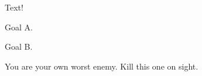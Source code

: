 \documentclass[char]{elementals}
\begin{document}
\name{\cDema{}}

Text!

\begin{itemz}[Goals]
  \item Goal A.
  \item Goal B.
\end{itemz}

\begin{contacts}
  \contact{\cDema{}} You are your own worst enemy.
	\contact{\cLeader{}} Kill this one on sight.
\end{contacts}
\end{document}
